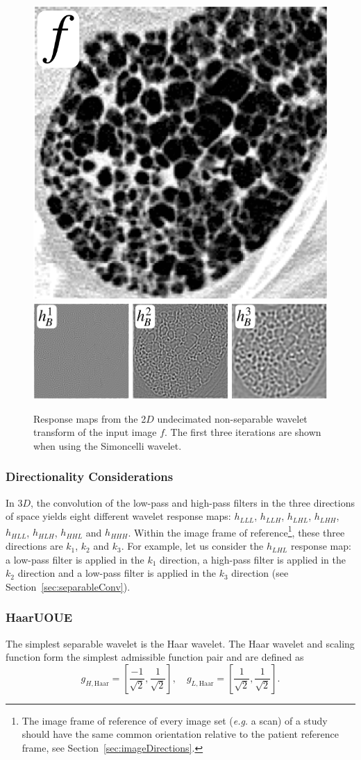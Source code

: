 \documentclass[fleqn,a4paper,oneside,openany]{book}
\newcommand\id[1]{{\hfill\normalsize{\idfont #1}}}
\begin{document}
%
\begin{figure}
\centering
\includegraphics[trim = 0 0 0 0, clip, width=0.2\linewidth]{f.png}\\
\includegraphics[trim = 0 0 0 0, clip, width=0.6\linewidth]{nonseparableWT.png}\\
\caption{Response maps from the 2$D$ undecimated non-separable wavelet transform of the input image $f$.
The first three iterations are shown when using the Simoncelli wavelet.}
  \label{fig:nonseparableWT}
\end{figure}
%
\subsubsection{Directionality Considerations}\label{sec:directionalityWT}
%
In 3$D$, the convolution of the low-pass and high-pass filters in the three directions of space yields eight different wavelet response maps:  $h_{LLL}$, $h_{LLH}$, $h_{LHL}$, $h_{LHH}$, $h_{HLL}$, $h_{HLH}$, $h_{HHL}$ and $h_{HHH}$. Within the image frame of reference\footnote{The image frame of reference of every image set (\textit{e.g.} a scan) of a study should have the same common orientation relative to the patient reference frame, see Section~\ref{sec:imageDirections}.}, these three directions are $k_1$, $k_2$ and $k_3$. For example, let us consider the $h_{LHL}$ response map: a low-pass filter is applied in the $k_1$ direction, a high-pass filter is applied in the $k_2$ direction and a low-pass filter is applied in the $k_3$ direction (see Section~\ref{sec:separableConv}).
%
\subsubsection[Haar]{Haar\id{UOUE}}\label{sec:haar}
%
The simplest separable wavelet is the Haar wavelet.
The Haar wavelet and scaling function form the simplest admissible function pair and are defined as~\cite{Lee2018}
$$g_{H,\text{Haar}} = \left[ \frac{-1}{\sqrt{2}}, \frac{1}{\sqrt{2}}\right], \quad g_{L,\text{Haar}} = \left[ \frac{1}{\sqrt{2}}, \frac{1}{\sqrt{2}}\right].$$
\end{document}
